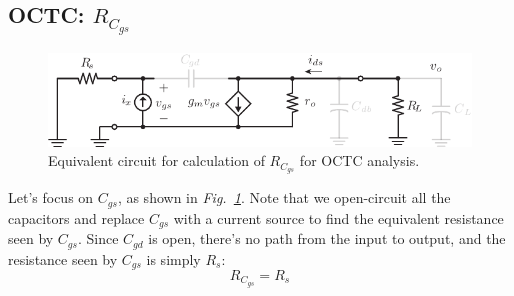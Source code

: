 \subsection{OCTC: \texorpdfstring{$R_{C_{gs}}$}{Equivalent Gate-Source Capacitor Resistance}}
\begin{figure}[tb]
\centering
\includegraphics[scale=1]{cs_amp_ac_caps_Cgs}
\caption{Equivalent circuit for calculation of $R_{C_{gs}}$ for OCTC analysis.} \label{fig:cs_amp_ac_caps_Cgs}
\end{figure}
Let's focus on $C_{gs}$, as shown in \emph{Fig.~\ref{fig:cs_amp_ac_caps_Cgs}}. Note that we open-circuit all the capacitors and replace $C_{gs}$ with a current source to find the equivalent resistance seen by $C_{gs}$.
 Since $C_{gd}$ is open, there's no path from the input to output, and the resistance seen by $C_{gs}$ is simply $R_s$:
    \begin{equation}
        {R_{C_{gs}}} = R_{s}
    \end{equation}

